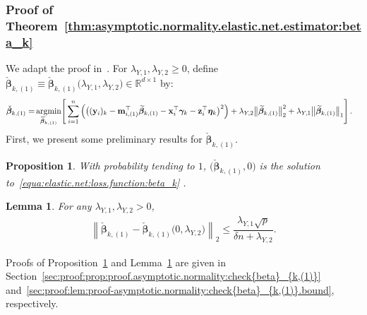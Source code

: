 \documentclass[
  12pt]{article}
\newtheorem{lem}[thm]{Lemma}
\newtheorem{proposition}[thm]{Proposition}
\def\R{\mathbb{R}}
\def\M{\mathbf{m}}
\def\X{\mathbf{x}}
\def\Y{\mathbf{y}}
\def\Z{\mathbf{z}}
\begin{document}
\subsubsection{Proof of Theorem~\ref{thm:asymptotic.normality.elastic.net.estimator:beta_k}}
\label{sec:proof:thm:asymptotic.normality.elastic.net.estimator:beta_k}
We adapt the proof in~\cite[Theorem 3.3]{Zou-Zhang:2009}. 
For $\lambda_{Y,1}, \lambda_{Y,2} \geq  0$,  define  $\check{\bm{\beta}}_{k,(1)} \equiv  \check{\bm{\beta}}_{k,(1)} \big( \lambda_{Y,1} , \lambda_{Y,2} \big) \in \R^{d \times 1}$ by:  
\begin{align}
	\check{\bm{\beta}}_{k,(1)} = & \,  \underset{ \widetilde{\bm{\beta}}_{k,(1)}    }{\textrm{argmin}}   
	\Bigg[  \sum_{i=1}^{n}  \left(   \big(  (\Y_{i})_{k}   -     \M_{i,(1)} ^{\top}\widetilde{\bm{\beta}}_{k,(1)} -     \X_{i }^{\top}  \bm{\gamma}_{k}   -    \Z_{i }^{\top} \bm{\eta}_{k}     
	\big)^{2}   
	\right)   
	+  \lambda_{Y,2}  \big\|  \widetilde{ \bm{\beta}}_{k, (1)}   \big\|_{2}^{2}  +  \lambda_{Y,1}  \big\|  \widetilde{\bm{\beta}}_{k, (1)}   \big\|_{1}   \Bigg]  \,  .   
	\label{proof-asymptotic.normality:check{beta}_{k,(1)}.definition}    
\end{align}
First, we present  some  preliminary results for $\check{\bm{\beta}}_{k,(1)}$. 
\begin{proposition}
	\label{prop:proof.asymptotic.normality:check{beta}_{k,(1)}}
	With probability tending to $1$, $\big( \check{\bm{\beta}}_{k,(1)} , 0 \big)$ is the solution to~\eqref{equa:elastic.net:loss.function:beta_k}%
	. 
\end{proposition}
\begin{lem}
	\label{lem:proof-asymptotic.normality:check{beta}_{k,(1)}.bound}
	For any $\lambda_{Y,1}, \lambda_{Y,2} > 0$, 
	\begin{align*}
		\left\| \check{\bm{\beta}}_{k,(1)} -  \check{\bm{\beta}}_{k,(1)} \big( 0 , \lambda_{Y,2} \big)  \right\|_{2}  \leq  
			\dfrac{ \lambda_{Y,1} \sqrt{p} }{\delta n + \lambda_{Y,2} } 
			.   
	\end{align*} 
\end{lem}
\noindent   
Proofs of Proposition~\ref{prop:proof.asymptotic.normality:check{beta}_{k,(1)}} and Lemma~\ref{lem:proof-asymptotic.normality:check{beta}_{k,(1)}.bound} are given in Section~\ref{sec:proof:prop:proof.asymptotic.normality:check{beta}_{k,(1)}} and~\ref{sec:proof:lem:proof-asymptotic.normality:check{beta}_{k,(1)}.bound}, respectively. 
\end{document}
